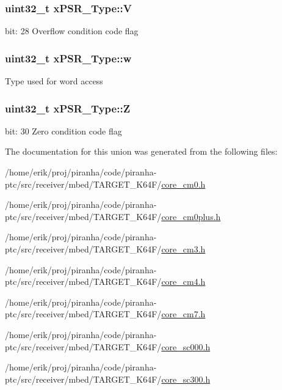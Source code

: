 \subsubsection[{\texorpdfstring{V}{V}}]{\setlength{\rightskip}{0pt plus 5cm}uint32\+\_\+t x\+P\+S\+R\+\_\+\+Type\+::V}\hypertarget{unionxPSR__Type_af14df16ea0690070c45b95f2116b7a0a}{}\label{unionxPSR__Type_af14df16ea0690070c45b95f2116b7a0a}
bit\+: 28 Overflow condition code flag 
\subsubsection[{\texorpdfstring{w}{w}}]{\setlength{\rightskip}{0pt plus 5cm}uint32\+\_\+t x\+P\+S\+R\+\_\+\+Type\+::w}\hypertarget{unionxPSR__Type_a1a47176768f45f79076c4f5b1b534bc2}{}\label{unionxPSR__Type_a1a47176768f45f79076c4f5b1b534bc2}
Type used for word access 
\subsubsection[{\texorpdfstring{Z}{Z}}]{\setlength{\rightskip}{0pt plus 5cm}uint32\+\_\+t x\+P\+S\+R\+\_\+\+Type\+::Z}\hypertarget{unionxPSR__Type_a1e5d9801013d5146f2e02d9b7b3da562}{}\label{unionxPSR__Type_a1e5d9801013d5146f2e02d9b7b3da562}
bit\+: 30 Zero condition code flag 

The documentation for this union was generated from the following files\+:\begin{DoxyCompactItemize}
\item 
/home/erik/proj/piranha/code/piranha-\/ptc/src/receiver/mbed/\+T\+A\+R\+G\+E\+T\+\_\+\+K64\+F/\hyperlink{core__cm0_8h}{core\+\_\+cm0.\+h}\item 
/home/erik/proj/piranha/code/piranha-\/ptc/src/receiver/mbed/\+T\+A\+R\+G\+E\+T\+\_\+\+K64\+F/\hyperlink{core__cm0plus_8h}{core\+\_\+cm0plus.\+h}\item 
/home/erik/proj/piranha/code/piranha-\/ptc/src/receiver/mbed/\+T\+A\+R\+G\+E\+T\+\_\+\+K64\+F/\hyperlink{core__cm3_8h}{core\+\_\+cm3.\+h}\item 
/home/erik/proj/piranha/code/piranha-\/ptc/src/receiver/mbed/\+T\+A\+R\+G\+E\+T\+\_\+\+K64\+F/\hyperlink{core__cm4_8h}{core\+\_\+cm4.\+h}\item 
/home/erik/proj/piranha/code/piranha-\/ptc/src/receiver/mbed/\+T\+A\+R\+G\+E\+T\+\_\+\+K64\+F/\hyperlink{core__cm7_8h}{core\+\_\+cm7.\+h}\item 
/home/erik/proj/piranha/code/piranha-\/ptc/src/receiver/mbed/\+T\+A\+R\+G\+E\+T\+\_\+\+K64\+F/\hyperlink{core__sc000_8h}{core\+\_\+sc000.\+h}\item 
/home/erik/proj/piranha/code/piranha-\/ptc/src/receiver/mbed/\+T\+A\+R\+G\+E\+T\+\_\+\+K64\+F/\hyperlink{core__sc300_8h}{core\+\_\+sc300.\+h}\end{DoxyCompactItemize}
